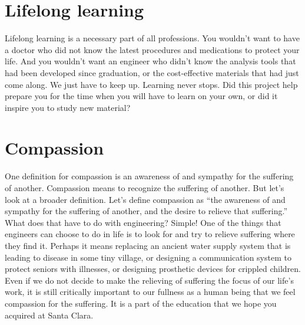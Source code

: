 \section{Lifelong learning}
Lifelong learning is a necessary part of all professions. You wouldn’t want to have a doctor who did not know the latest procedures and medications to protect your life. And you wouldn’t want an engineer who didn’t know the analysis tools that had been developed since graduation, or the cost-effective materials that had just come along. We just have to keep up. Learning never stops. Did this project help prepare you for the time when you will have to learn on your own, or did it inspire you to study new material?

\section{Compassion}
One definition for compassion is an awareness of and sympathy for the suffering of another. Compassion means to recognize the suffering of another. But let’s look at a broader definition. Let’s define compassion as “the awareness of and sympathy for the suffering of another, and the desire to relieve that suffering.” What does that have to do with engineering? Simple! One of the things that engineers can choose to do in life is to look for and try to relieve suffering where they find it. Perhaps it means replacing an ancient water supply system that is leading to disease in some tiny village, or designing a communication system to protect seniors with illnesses, or designing prosthetic devices for crippled children. Even if we do not decide to make the relieving of suffering the focus of our life’s work, it is still critically important to our fullness as a human being that we feel compassion for the suffering. It is a part of the education that we hope you acquired at Santa Clara.
